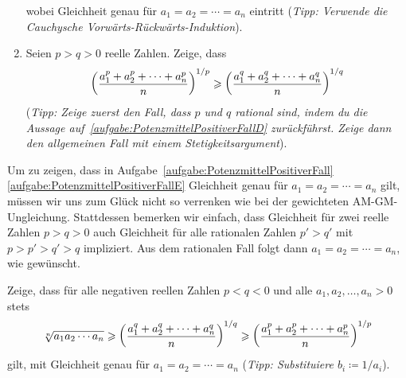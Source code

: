 \begin{aufgabe*}
\begin{enumerate}[label={$(\alph*)$},ref={$(\alph*)$}]
\begin{equation*}
		\end{equation*}
		wobei Gleichheit genau für $a_1=a_2=\dotsb=a_n$ eintritt (\emph{Tipp: Verwende die Cauchysche Vorwärts-Rückwärts-Induktion}).\label{aufgabe:PotenzmittelPositiverFallC}
		\item Seien $p>q>0$ reelle Zahlen. Zeige, dass\label{aufgabe:PotenzmittelPositiverFallD}
		\begin{equation*}
			\parens*{\frac{a_1^{p}+a_2^{p}+\dotsb+a_n^{p}}{n}}^{1/p}\geqslant \parens*{\frac{a_1^{q}+a_2^{q}+\dotsb+a_n^q}{n}}^{1/q}
		\end{equation*}
		(\emph{Tipp: Zeige zuerst den Fall, dass $p$ und $q$ rational sind, indem du die Aussage auf~\ref{aufgabe:PotenzmittelPositiverFallD} zurückführst. Zeige dann den allgemeinen Fall mit einem Stetigkeitsargument}).\label{aufgabe:PotenzmittelPositiverFallE}
	\end{enumerate}
\end{aufgabe*}
Um zu zeigen, dass in Aufgabe~\ref{aufgabe:PotenzmittelPositiverFall}\ref{aufgabe:PotenzmittelPositiverFallE} Gleichheit genau für $a_1=a_2=\dotsb=a_n$ gilt, müssen wir uns zum Glück nicht so verrenken wie bei der gewichteten AM-GM-Ungleichung. Stattdessen bemerken wir einfach, dass Gleichheit für zwei reelle Zahlen $p>q>0$ auch Gleichheit für alle rationalen Zahlen $p'>q'$ mit $p>p'>q'>q$ impliziert. Aus dem rationalen Fall folgt dann $a_1=a_2=\dotsb=a_n$, wie gewünscht.
\begin{aufgabe*}
	Zeige, dass für alle negativen reellen Zahlen $p<q<0$ und alle $a_1,a_2,\dotsc,a_n>0$ stets
	\begin{equation*}
		\sqrt[n]{a_1a_2\dotsm a_n}\geqslant \parens*{\frac{a_1^q+a_2^q+\dotsb+a_n^q}{n}}^{1/q}\geqslant  \parens*{\frac{a_1^p+a_2^p+\dotsb+a_n^p}{n}}^{1/p}
	\end{equation*}
	gilt, mit Gleichheit genau für $a_1=a_2=\dotsb=a_n$ (\emph{Tipp: Substituiere $b_i\coloneqq 1/a_i$}).
\end{aufgabe*}